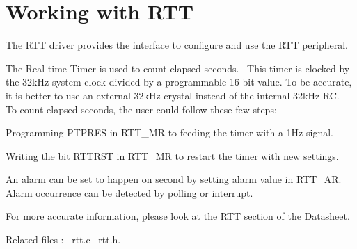 \hypertarget{group__rtt__module}{}\section{Working with R\+TT}
\label{group__rtt__module}
The R\+TT driver provides the interface to configure and use the R\+TT peripheral.

The Real-\/time Timer is used to count elapsed seconds.~\newline
This timer is clocked by the 32k\+Hz system clock divided by a programmable 16-\/bit value. To be accurate, it is better to use an external 32k\+Hz crystal instead of the internal 32k\+Hz RC.~\newline
 To count elapsed seconds, the user could follow these few steps\+: 
\begin{DoxyItemize}
\item Programming P\+T\+P\+R\+ES in R\+T\+T\+\_\+\+MR to feeding the timer with a 1Hz signal. 
\item Writing the bit R\+T\+T\+R\+ST in R\+T\+T\+\_\+\+MR to restart the timer with new settings.  
\end{DoxyItemize}

An alarm can be set to happen on second by setting alarm value in R\+T\+T\+\_\+\+AR. Alarm occurrence can be detected by polling or interrupt.

For more accurate information, please look at the R\+TT section of the Datasheet.

Related files \+:~\newline
rtt.\+c~\newline
 rtt.\+h.~\newline
 